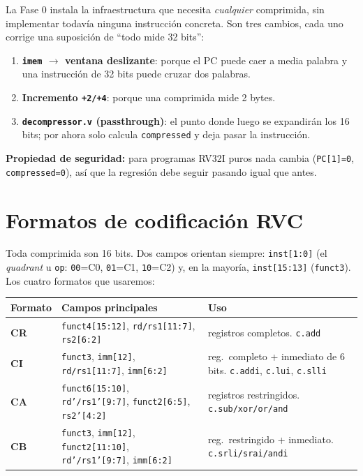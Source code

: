 \documentclass[11pt]{article}
\newcommand{\code}[1]{\texttt{#1}}
\begin{document}
La Fase 0 instala la infraestructura que necesita \emph{cualquier} comprimida,
sin implementar todavía ninguna instrucción concreta. Son tres cambios, cada uno
corrige una suposición de ``todo mide 32 bits'':

\begin{enumerate}[leftmargin=1.6em]
  \item \textbf{\code{imem} $\to$ ventana deslizante}: porque el PC puede caer a
        media palabra y una instrucción de 32 bits puede cruzar dos palabras.
  \item \textbf{Incremento \code{+2/+4}}: porque una comprimida mide 2 bytes.
  \item \textbf{\code{decompressor.v} (passthrough)}: el punto donde luego se
        expandirán los 16 bits; por ahora solo calcula \code{compressed} y deja
        pasar la instrucción.
\end{enumerate}

\noindent
\textbf{Propiedad de seguridad:} para programas RV32I puros nada cambia
(\code{PC[1]=0}, \code{compressed=0}), así que la regresión debe seguir pasando
igual que antes.

\section{Formatos de codificación RVC}

Toda comprimida son 16 bits. Dos campos orientan siempre: \code{inst[1:0]} (el
\emph{quadrant} u \code{op}: \code{00}=C0, \code{01}=C1, \code{10}=C2) y, en la
mayoría, \code{inst[15:13]} (\code{funct3}). Los cuatro formatos que usaremos:

\begin{center}
\small
\begin{tabular}{@{}llp{8.2cm}@{}}
\toprule
Formato & Campos principales & Uso \\
\midrule
\textbf{CR} & \code{funct4[15:12]}, \code{rd/rs1[11:7]}, \code{rs2[6:2]} & registros completos. \code{c.add} \\
\textbf{CI} & \code{funct3}, \code{imm[12]}, \code{rd/rs1[11:7]}, \code{imm[6:2]} & reg.\ completo + inmediato de 6 bits. \code{c.addi}, \code{c.lui}, \code{c.slli} \\
\textbf{CA} & \code{funct6[15:10]}, \code{rd'/rs1'[9:7]}, \code{funct2[6:5]}, \code{rs2'[4:2]} & registros restringidos. \code{c.sub/xor/or/and} \\
\textbf{CB} & \code{funct3}, \code{imm[12]}, \code{funct2[11:10]}, \code{rd'/rs1'[9:7]}, \code{imm[6:2]} & reg.\ restringido + inmediato. \code{c.srli/srai/andi} \\
\bottomrule
\end{tabular}
\end{center}
\end{document}
